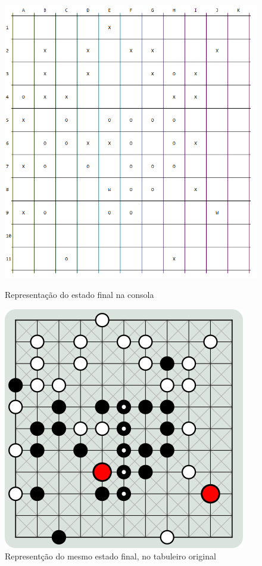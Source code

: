 \documentclass[a4paper]{article}
\begin{document}
\begin{figure}[h!]
\centering
\begin{minipage}{.35\textwidth}
	\centering
	\includegraphics[width=\textwidth]{images/self_full_board.png}
	\caption{Representação do estado final na consola}
	\label{Figura 7}
\end{minipage}
\quad \quad
\begin{minipage}{.35\textwidth}
	\centering
	\includegraphics[width=\textwidth]{images/fabrik_full_board.png}
	\caption{Representção do mesmo estado final, no tabuleiro original}
	\label{Figura 8}
\end{minipage}
\end{figure}
\end{document}
